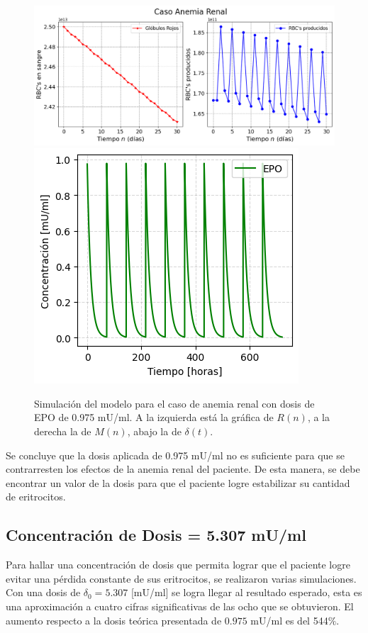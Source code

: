 \begin{figure}[H]
    \centering
    \captionsetup{justification=centering}
    \includegraphics[scale=0.534]{figures/AR11.png}
    \includegraphics[scale=0.8]{figures/AR12.png}
    \caption{Simulación del modelo para el caso de anemia renal con dosis de EPO de 0.975 mU/ml. A la izquierda está la gráfica de $R(n)$, a la derecha la de $M(n)$, abajo la de $\delta(t)$.}
    \label{sec:variaciones:fig:Anemia1}
\end{figure}

Se concluye que la dosis aplicada de 0.975 mU/ml no es suficiente para que se contrarresten los efectos de la anemia renal del paciente. De esta manera, se debe encontrar un valor de la dosis para que el paciente logre estabilizar su cantidad de eritrocitos.

\subsection{Concentración de Dosis = 5.307 mU/ml}\label{subsec:variaciones:anemia:bien}

Para hallar una concentración de dosis que permita lograr que el paciente logre evitar una pérdida constante de sus eritrocitos, se realizaron varias simulaciones. Con una dosis de $\delta_0 = 5.307$ [mU/ml] se logra llegar al resultado esperado, esta es una aproximación a cuatro cifras significativas de las ocho que se obtuvieron. El aumento respecto a la dosis teórica presentada de $0.975$ mU/ml es del 544$\%$. 

